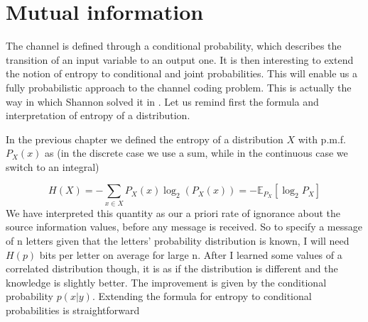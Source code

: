 \section{Mutual information}
The channel is defined through a conditional probability, which describes the transition of an input variable to an output one. It is then interesting to extend the notion of entropy to conditional and joint probabilities. This will enable us a fully probabilistic approach to the channel coding problem. This is actually the way in which Shannon solved it in \cite{shannon}. Let us remind first the formula and interpretation of entropy of a distribution.

In the previous chapter we defined the entropy of a distribution $X$ with p.m.f. $P_X(x)$ as (in the discrete case we use a sum, while in the continuous case we switch to an integral)

\begin{equation}
H(X) = -\sum_{x \in X}P_X(x)\log_2\left(P_X(x)\right) = -\mathbb{E}_{P_X}\left[\log_2 P_X\right]
\end{equation}
We have interpreted this quantity as our a priori rate of ignorance about the source information values, before any message is received. So to specify a message of n letters given that the letters' probability distribution is known, I will need $H(p)$ bits per letter on average for large n. After I learned some values of a correlated distribution though, it is as if the distribution is different and the knowledge is slightly better. The improvement is given by the conditional probability $p(x|y)$.
Extending the formula for entropy to conditional probabilities is straightforward

